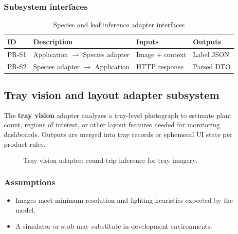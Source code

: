 \subsubsection{Subsystem interfaces}
\begin{table}[H]
\centering
\small
\begin{tabular}{|p{0.9cm}|p{3.4cm}|p{3.0cm}|p{3.5cm}|}
\hline
\textbf{ID} & \textbf{Description} & \textbf{Inputs} & \textbf{Outputs} \\
\hline
PR-S1 & Application $\rightarrow$ Species adapter & Image + context & Label JSON \\
\hline
PR-S2 & Species adapter $\rightarrow$ Application & HTTP response & Parsed DTO \\
\hline
\end{tabular}
\caption{Species and leaf inference adapter interfaces}
\end{table}

\subsection{Tray vision and layout adapter subsystem}

The \textbf{tray vision} adapter analyzes a tray-level photograph to estimate plant count, regions of interest, or other layout features needed for monitoring dashboards. Outputs are merged into tray records or ephemeral UI state per product rules.

\begin{figure}[H]
\centering
{}
\caption{Tray vision adapter: round-trip inference for tray imagery.}
\label{fig:proc-tray}
\end{figure}

\subsubsection{Assumptions}
\begin{itemize}
  \item Images meet minimum resolution and lighting heuristics expected by the model.
  \item A simulator or stub may substitute in development environments.
\end{itemize}

